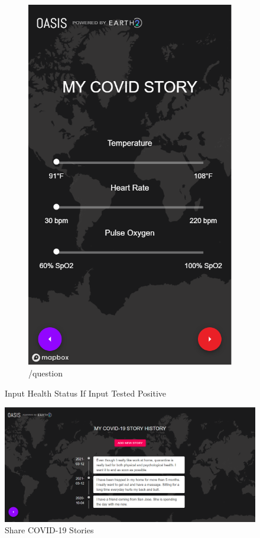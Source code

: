 \documentclass{ucsdreport}
\begin{document}
\begin{figure}[H]
\begin{subfigure}{.33\textwidth}
		\includegraphics[scale = 0.47]{images/update6.PNG}
		\caption{/question}
	\end{subfigure}
	\caption{Input Health Status If Input Tested Positive}
\end{figure}


\begin{figure}[H]
    \centering
    \includegraphics[scale=0.5]{images/mystories.PNG}
    \caption{Share COVID-19 Stories}
\end{figure}
\end{document}
